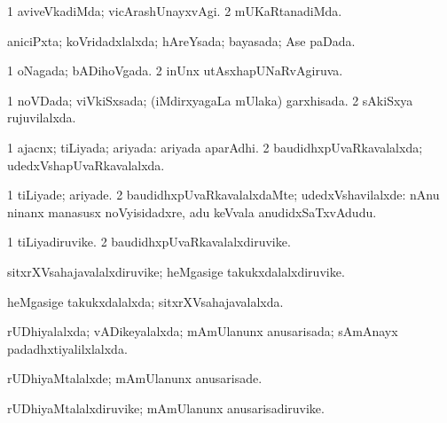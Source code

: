 \bentry 
{} 
\gl{\kirxvi}
\expl{}
\bmng
\bnum
\num{1} aviveVkadiMda; vicArashUnayxvAgi. 
\num{2} mUKaRtanadiMda. 
\enum
\emng
\eentry

\bentry
{} 
\gl{\gu}
\expl{}
\bmng
aniciPxta; koVridadxlalxda; hAreYsada; bayasada; Ase paDada. 
\emng
\eentry

\bentry
{} 
\gl{\gu}
\expl{}
\bmng
\bnum
\num{1} oNagada; bADihoVgada. 
\num{2} inUnx utAsxhapUNaRvAgiruva. 
\enum
\emng
\eentry

\bentry
{} 
\gl{\gu}
\expl{}
\bmng
\bnum
\num{1} noVDada; viVkiSxsada; (iMdirxyagaLa mUlaka) garxhisada. 
\num{2} sAkiSxya rujuvilalxda. 
\enum
\emng
\eentry

\bentry
{} 
\gl{\gu}
\expl{}
\bmng
\bnum
\num{1} ajacnx; tiLiyada; ariyada:  ariyada aparAdhi. 
\num{2} baudidhxpUvaRkavalalxda; udedxVshapUvaRkavalalxda. 
\enum
\emng
\eentry

\bentry
{} 
\gl{\kirxvi}
\expl{}
\bmng
\bnum
\num{1} tiLiyade; ariyade. 
\num{2} baudidhxpUvaRkavalalxdaMte; udedxVshavilalxde:  nAnu ninanx manasusx noVyisidadxre, adu keVvala anudidxSaTxvAdudu. 
\enum
\emng
\eentry

\bentry
{} 
\gl{\nA}
\expl{}
\bmng
\bnum
\num{1} tiLiyadiruvike. 
\num{2} baudidhxpUvaRkavalalxdiruvike. 
\enum
\emng
\eentry

\bentry
{} 
\gl{\nA}
\expl{}
\bmng
sitxrXVsahajavalalxdiruvike; heMgasige takukxdalalxdiruvike. 
\emng
\eentry

\bentry
{} 
\gl{\gu}
\expl{}
\bmng
heMgasige takukxdalalxda; sitxrXVsahajavalalxda. 
\emng
\eentry

\bentry
{} 
\gl{\gu}
\expl{}
\bmng
rUDhiyalalxda; vADikeyalalxda; mAmUlanunx anusarisada; sAmAnayx padadhxtiyalilxlalxda. 
\emng
\eentry

\bentry
{} 
\gl{\kirxvi}
\expl{}
\bmng
rUDhiyaMtalalxde; mAmUlanunx anusarisade. 
\emng
\eentry

\bentry
{} 
\gl{\nA}
\expl{}
\bmng
rUDhiyaMtalalxdiruvike; mAmUlanunx anusarisadiruvike. 
\emng
\eentry

